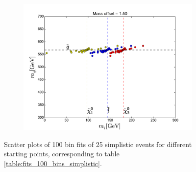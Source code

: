 \documentclass[twoside,english]{uiofysmaster}
\begin{document}
\begin{figure}[hbt]
	\begin{subfigure}[b]{0.49\textwidth}
		\includegraphics[width=\textwidth]{figures/25_events_simplistic_scipy_nelder-mead_without_smearing_1p50_initial_guess.pdf} 
		\caption{}
	\end{subfigure}
	\caption{Scatter plots of 100 bin fits of 25 simplistic events for different starting points, corresponding to table \ref{table:fits_100_bins_simplistic}.}
	\label{fig:fits_100_bins_simplistic}
\end{figure}
\end{document}
